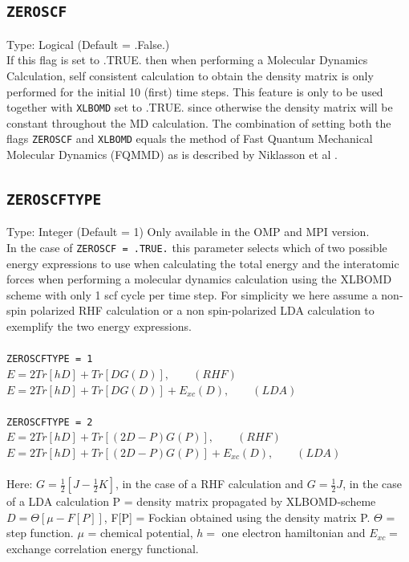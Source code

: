 \documentclass[a4paper,twoside,openany]{book}
\begin{document}
 \subsection{\texttt{ZEROSCF}}
 Type: Logical (Default = .False.)\\
 If this flag is set to .TRUE. then when performing a Molecular Dynamics Calculation, self consistent calculation to obtain the density matrix is only performed 
 for the initial 10 (first) time steps. This feature is only to be used together with \texttt{XLBOMD} set to .TRUE. since otherwise the density matrix will be constant 
 throughout the MD calculation. The combination of setting both the flags \texttt{ZEROSCF} and \texttt{XLBOMD} equals the method of Fast Quantum Mechanical 
 Molecular Dynamics (FQMMD) as is described by Niklasson et al \cite{AMN2}. 
 
  \subsection{\texttt{ZEROSCFTYPE}}
 Type: Integer (Default = 1) Only available in the OMP and MPI version. \\
 In the case of \texttt{ZEROSCF = .TRUE.} this parameter selects which of two possible energy expressions to use when calculating the total energy and the interatomic 
 forces when performing a molecular dynamics calculation using the XLBOMD scheme with only 1 scf cycle per time step. For simplicity we here assume a non-spin polarized 
 RHF calculation or a non spin-polarized LDA calculation to exemplify the two energy expressions. \\ \\
\noindent
\texttt{ZEROSCFTYPE = 1}\\
$E = 2Tr[hD] + Tr[DG(D)],  \qquad             (RHF)$\\
$E = 2Tr[hD] + Tr[DG(D)] + E_{xc}(D),  \qquad   (LDA)$\\ \\
\noindent
\texttt{ZEROSCFTYPE = 2}\\
$E = 2Tr[hD] + Tr[(2D-P)G( P )],\qquad                 (RHF)$\\
$E = 2Tr[hD] + Tr[(2D-P)G( P )] + E_{xc}(D), \qquad       (LDA)$ \\ \\
\noindent
Here:
$G = \frac{1}{2}[ J - \frac{1}{2}K ]$,  in the case of a RHF calculation and $G = \frac{1}{2}J$,  in the case of a LDA calculation 
P = density matrix propagated by XLBOMD-scheme $D = \Theta[\mu-F[P]]$,     F[P] = Fockian obtained using the density matrix P.
$\Theta$ = step function. $\mu$ = chemical potential, $h =$ one electron hamiltonian and $E_{xc}=$ exchange correlation energy functional.
\end{document}
